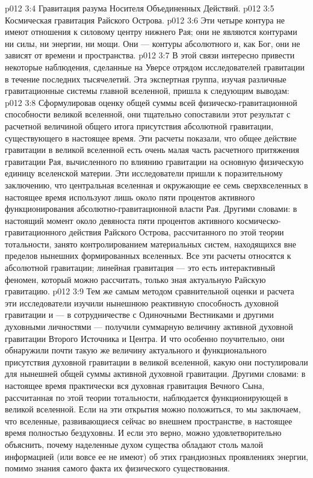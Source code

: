 \vs p012 3:4 \bibnobreakspace Гравитация разума Носителя Объединенных Действий.
\vs p012 3:5 \bibnobreakspace Космическая гравитация Райского Острова.
\vs p012 3:6 \pc Эти четыре контура не имеют отношения к силовому центру нижнего Рая; они не являются контурами ни силы, ни энергии, ни мощи. Они --- контуры абсолютного  и, как Бог, они не зависят от времени и пространства.
\vs p012 3:7 В этой связи интересно привести некоторые наблюдения, сделанные на Уверсе отрядом исследователей гравитации в течение последних тысячелетий. Эта экспертная группа, изучая различные гравитационные системы главной вселенной, пришла к следующим выводам:
\vs p012 3:8 \bibnobreakspace {} Сформулировав оценку общей суммы всей физическо\hyp{}гравитационной способности великой вселенной, они тщательно сопоставили этот результат с расчетной величиной общего итога присутствия абсолютной гравитации, существующего в настоящее время. Эти расчеты показали, что общее действие гравитации в великой вселенной есть очень малая часть расчетного притяжения гравитации Рая, вычисленного по влиянию гравитации на основную физическую единицу вселенской материи. Эти исследователи пришли к поразительному заключению, что центральная вселенная и окружающие ее семь сверхвселенных в настоящее время используют лишь около пяти процентов активного функционирования абсолютно\hyp{}гравитационной власти Рая. Другими словами: в настоящий момент около девяноста пяти процентов активного космическо\hyp{}гравитационного действия Райского Острова, рассчитанного по этой теории тотальности, занято контролированием материальных систем, находящихся вне пределов нынешних формированных вселенных. Все эти расчеты относятся к абсолютной гравитации; линейная гравитация --- это есть интерактивный феномен, который можно рассчитать, только зная актуальную Райскую гравитацию.
\vs p012 3:9 \bibnobreakspace {} Тем же самым методом сравнительной оценки и расчета эти исследователи изучили нынешнюю реактивную способность духовной гравитации и --- в сотрудничестве с Одиночными Вестниками и другими духовными личностями --- получили суммарную величину активной духовной гравитации Второго Источника и Центра. И что особенно поучительно, они обнаружили почти такую же величину актуального и функционального присутствия духовной гравитации в великой вселенной, какую они постулировали для нынешней общей суммы активной духовной гравитации. Другими словами: в настоящее время практически вся духовная гравитация Вечного Сына, рассчитанная по этой теории тотальности, наблюдается функционирующей в великой вселенной. Если на эти открытия можно положиться, то мы заключаем, что вселенные, развивающиеся сейчас во внешнем пространстве, в настоящее время полностью бездуховны. И если это верно, можно удовлетворительно объяснить, почему наделенные духом существа обладают столь малой информацией (или вовсе ее не имеют) об этих грандиозных проявлениях энергии, помимо знания самого факта их физического существования.
